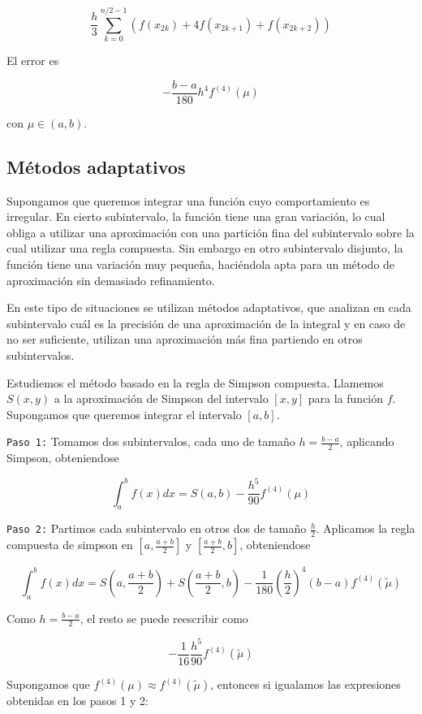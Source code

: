 \[\frac{h}{3}\sum_{k = 0}^{n/2 - 1}\left(f(x_{2k}) + 4 f(x_{2k + 1}) + f(x_{2k + 2})\right)\]

El error es

\[-\frac{b - a}{180}h^4 f^{(4)}(\mu)\]

con $\mu \in (a, b)$.

\subsection{Métodos adaptativos}

Supongamos que queremos integrar una función cuyo comportamiento es irregular. En cierto subintervalo, la función tiene una gran variación, lo cual obliga a utilizar una aproximación con una partición fina del subintervalo sobre la cual utilizar una regla compuesta. Sin embargo en otro subintervalo disjunto, la función tiene una variación muy pequeña, haciéndola apta para un método de aproximación sin demasiado refinamiento.

En este tipo de situaciones se utilizan métodos adaptativos, que analizan en cada subintervalo cuál es la precisión de una aproximación de la integral y en caso de no ser suficiente, utilizan una aproximación más fina partiendo en otros subintervalos.

Estudiemos el método basado en la regla de Simpson compuesta. Llamemos $S(x, y)$ a la aproximación de Simpson del intervalo $[x, y]$ para la función $f$. Supongamos que queremos integrar el intervalo $[a, b]$.

\texttt{Paso 1:} Tomamos dos subintervalos, cada uno de tamaño $h = \frac{b - a}{2}$, aplicando Simpson, obteniendose

\[\int_{a}^b f(x) dx = S(a, b) - \frac{h^5}{90} f^{(4)}(\mu)\]

\texttt{Paso 2:} Partimos cada subintervalo en otros dos de tamaño $\frac{h}{2}$. Aplicamos la regla compuesta de simpson en $\left[a, \frac{a + b}{2}\right]$ y $\left[\frac{a + b}{2}, b\right]$, obteniendose

\[\int_{a}^b f(x) dx = S\left(a, \frac{a + b}{2}\right) + S\left(\frac{a + b}{2}, b\right) - \frac{1}{180}\left(\frac{h}{2}\right)^4(b - a) f^{(4)}(\tilde{\mu})\]

Como $h = \frac{b - a}{2}$, el resto se puede reescribir como

\[- \frac{1}{16}\frac{h^5}{90} f^{(4)}(\tilde{\mu})\]

Supongamos que $f^{(4)}(\mu) \approx f^{(4)}(\tilde{\mu})$, entonces si igualamos las expresiones obtenidas en los pasos 1 y 2:

